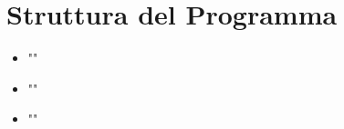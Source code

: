 \section{Struttura del Programma}
\begin{itemize}
    \item ""
    \item ""
    \item ""
\end{itemize}